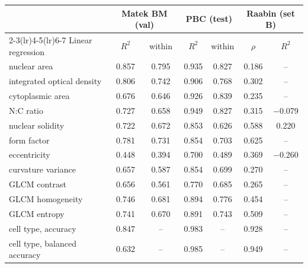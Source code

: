 \begin{tabular}{lcccccc}
\toprule
 & \multicolumn{2}{c}{Matek BM (val)} & \multicolumn{2}{c}{PBC (test)} & \multicolumn{2}{c}{Raabin (set B)} \\
\cmidrule(lr){2-3}\cmidrule(lr){4-5}\cmidrule(lr){6-7}
Linear regression & $R^2$ & within & $R^2$ & within & $\rho$ & $R^2$ \\
\midrule
nuclear area & 0.857 & 0.795 & 0.935 & 0.827 & 0.186 & -- \\
integrated optical density & 0.806 & 0.742 & 0.906 & 0.768 & 0.302 & -- \\
\addlinespace
cytoplasmic area & 0.676 & 0.646 & 0.926 & 0.839 & 0.235 & -- \\
N:C ratio & 0.727 & 0.658 & 0.949 & 0.827 & 0.315 & $-$0.079 \\
\addlinespace
nuclear solidity & 0.722 & 0.672 & 0.853 & 0.626 & 0.588 & 0.220 \\
form factor & 0.781 & 0.731 & 0.854 & 0.703 & 0.625 & -- \\
eccentricity & 0.448 & 0.394 & 0.700 & 0.489 & 0.369 & $-$0.260 \\
curvature variance & 0.657 & 0.587 & 0.854 & 0.699 & 0.270 & -- \\
\addlinespace
GLCM contrast & 0.656 & 0.561 & 0.770 & 0.685 & 0.265 & -- \\
GLCM homogeneity & 0.746 & 0.681 & 0.894 & 0.776 & 0.454 & -- \\
GLCM entropy & 0.741 & 0.670 & 0.891 & 0.743 & 0.509 & -- \\
\midrule
cell type, accuracy & 0.847 & -- & 0.983 & -- & 0.928 & -- \\
cell type, balanced accuracy & 0.632 & -- & 0.985 & -- & 0.949 & -- \\
\bottomrule
\end{tabular}
